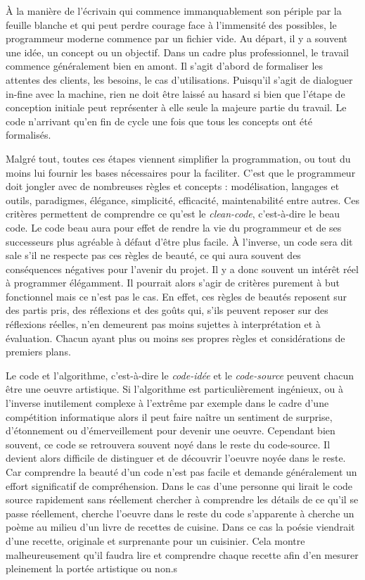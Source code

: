 \documentclass[12pt]{article} %
\begin{document}
À la manière de l'écrivain qui commence immanquablement son périple par la feuille blanche et qui peut perdre courage face à l'immensité des possibles, le programmeur moderne commence par un fichier vide. Au départ, il y a souvent une idée, un concept ou un objectif. Dans un cadre plus professionnel, le travail commence généralement bien en amont. Il s'agit d'abord de formaliser les attentes des clients, les besoins, le cas d'utilisations. Puisqu'il s'agit de dialoguer in-fine avec la machine, rien ne doit être laissé au hasard si bien que l'étape de conception initiale peut représenter à elle seule la majeure partie du travail. Le code n'arrivant qu'en fin de cycle une fois que tous les concepts ont été formalisés. 

Malgré tout, toutes ces étapes viennent simplifier la programmation, ou tout du moins lui fournir les bases nécessaires pour la faciliter. C'est que le programmeur doit jongler avec de nombreuses règles et concepts : modélisation, langages et outils, paradigmes, élégance, simplicité, efficacité, maintenabilité entre autres. Ces critères permettent de comprendre ce qu'est le \textit{clean-code}, c'est-à-dire le beau code. Le code beau aura pour effet de rendre la vie du programmeur et de ses successeurs plus agréable à défaut d'être plus facile. À l'inverse, un code sera dit sale s'il ne respecte pas ces règles de beauté, ce qui aura souvent des conséquences négatives pour l'avenir du projet. Il y a donc souvent un intérêt réel à programmer élégamment. Il pourrait alors s'agir de critères purement à but fonctionnel mais ce n'est pas le cas. En effet, ces règles de beautés reposent sur des partis pris, des réflexions et des goûts qui, s'ils peuvent reposer sur des réflexions réelles, n'en demeurent pas moins sujettes à interprétation et à évaluation. Chacun ayant plus ou moins ses propres règles et considérations de premiers plans. 

Le code et l'algorithme, c'est-à-dire le \textit{code-idée} et le \textit{code-source} peuvent chacun être une oeuvre artistique. Si l'algorithme est particulièrement ingénieux, ou à l'inverse inutilement complexe à l'extrême par exemple dans le cadre d'une compétition informatique alors il peut faire naître un sentiment de surprise, d'étonnement ou d'émerveillement pour devenir une oeuvre. Cependant bien souvent, ce code se retrouvera souvent noyé dans le reste du code-source. Il devient alors difficile de distinguer et de découvrir l'oeuvre noyée dans le reste. Car comprendre la beauté d'un code n'est pas facile et demande généralement un effort significatif de compréhension. Dans le cas d'une personne qui lirait le code source rapidement sans réellement chercher à comprendre les détails de ce qu'il se passe réellement, cherche l'oeuvre dans le reste du code s'apparente à cherche un poème au milieu d'un livre de recettes de cuisine. Dans ce cas la poésie viendrait d'une recette, originale et surprenante pour un cuisinier. Cela montre malheureusement qu'il faudra lire et comprendre chaque recette afin d'en mesurer pleinement la portée artistique ou non.s
\end{document}
